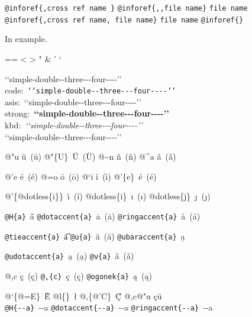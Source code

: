 \documentclass{book}
\makeatletter
\newcommand\Texinfocommandstyletextkbd[1]{{\ttfamily\textsl{#1}}}%
\newenvironment{Texinfopreformatted}{%
  \par\GNUTobeylines\obeyspaces\frenchspacing\parskip=\z@\parindent=\z@}{}
{\catcode`\^^M=13 \gdef\GNUTobeylines{\catcode`\^^M=13 \def^^M{\null\par}}}
\newenvironment{Texinfoindented}{\begin{list}{}{}\item\relax}{\end{list}}
\renewcommand{\_}{\Texinfounderscore\discretionary{}{}{}}
\makeatother
\begin{document}
\texttt{@inforef\{,cross ref name \}} 
\texttt{@inforef\{{,}{,}file name\}} \texttt{file name}
\texttt{@inforef\{,cross ref name,\ file name\}} \texttt{file name}
\texttt{@inforef\{\}} 



In example.
\begin{Texinfoindented}
\begin{Texinfopreformatted}%
\ttfamily 
<
>
"
\&
'
`

{`}{`}simple-double{-}{-}three{-}{-}{-}four{-}{-}{-}-{'}{'}\leavevmode{}\\
code:\ \texttt{{`}{`}simple-double{-}{-}three{-}{-}{-}four{-}{-}{-}-{'}{'}}\ \leavevmode{}\\
asis:\ {`}{`}simple-double{-}{-}three{-}{-}{-}four{-}{-}{-}-{'}{'}\ \leavevmode{}\\
strong:\ \textbf{{`}{`}simple-double{-}{-}three{-}{-}{-}four{-}{-}{-}-{'}{'}}\ \leavevmode{}\\
kbd:\ \Texinfocommandstyletextkbd{{`}{`}simple-double{-}{-}three{-}{-}{-}four{-}{-}{-}-{'}{'}}\ \leavevmode{}\\

`\hbox{}`simple-double-\hbox{}-three{-}{-}{-}four{-}{-}{-}-'\hbox{}'\leavevmode{}\\

%
%
%
%

@"u \"{u}\ (ü)
@"\{U\}\ \"{U}\ (Ü) 
@\~{}n \~{n}\ (ñ)
@\^{}a \^{a}\ (â)

@'e \'{e}\ (é)
@=o \={o}\ (ō)
@`i \`{i}\ (ì)
@'\{e\}\ \'{e}\ (é)

@'\{@dotless\{i\}\}\ \'{\i{}}\ (í)
@dotless\{i\}\ \i{}\ (ı)
@dotless\{j\}\ \j{}\ (ȷ)

\texttt{@H\{a\}}\ \H{a}
\texttt{@dotaccent\{a\}}\ \.{a}\ (ȧ)
\texttt{@ringaccent\{a\}}\ \r{a}\ (å)

\texttt{@tieaccent\{a\}}\ \t{a}
\texttt{@u\{a\}}\ \u{a}\ (ă)
\texttt{@ubaraccent\{a\}}\ \b{a}

\texttt{@udotaccent\{a\}}\ \d{a}\ (ạ)
\texttt{@v\{a\}}\ \v{a}\ (ǎ)

@,c \c{c}\ (ç)
\texttt{@,\{c\}}\ \c{c}\ (ç)
\texttt{@ogonek\{a\}}\ \k{a}\ (ą)

@`\{@=E\}\ \`{\={E}}
@l\{\}\ \l{}
@,\{@'C\}\ \c{\'{C}}
@,c@"u \c{c}\"{u}\ \leavevmode{}\\

\texttt{@H\{{-}{-}a\}}\ \H{{-}{-}a}
\texttt{@dotaccent\{{-}{-}a\}}\ \.{{-}{-}a}
\texttt{@ringaccent\{{-}{-}a\}}\ \r{{-}{-}a}


\end{Texinfopreformatted}
\end{Texinfoindented}
\end{document}

